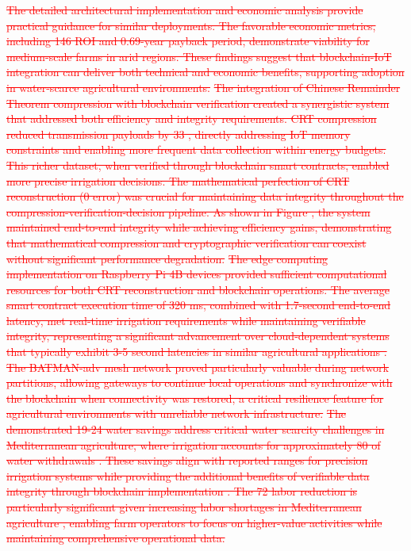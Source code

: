 \documentclass[pdflatex,sn-mathphys-num]{sn-jnl}
\theoremstyle{thmstyleone}
\theoremstyle{thmstyletwo}
\theoremstyle{thmstylethree}
\begin{document}
{\textcolor{red}{\sout{The detailed architectural implementation and economic analysis provide practical guidance for similar deployments. The favorable economic metrics, including 146 ROI and 0.69-year payback period, demonstrate viability for medium-scale farms in arid regions. These findings suggest that blockchain-IoT integration can deliver both technical and economic benefits, supporting adoption in water-scarce agricultural environments.}}
\textcolor{red}{\sout{The integration of Chinese Remainder Theorem compression with blockchain verification created a synergistic system that addressed both efficiency and integrity requirements. CRT compression reduced transmission payloads by 33 , directly addressing IoT memory constraints and enabling more frequent data collection within energy budgets. This richer dataset, when verified through blockchain smart contracts, enabled more precise irrigation decisions. The mathematical perfection of CRT reconstruction (0 error) was crucial for maintaining data integrity throughout the compression-verification-decision pipeline. As shown in Figure , the system maintained end-to-end integrity while achieving efficiency gains, demonstrating that mathematical compression and cryptographic verification can coexist without significant performance degradation.}}
\textcolor{red}{\sout{The edge computing implementation on Raspberry Pi 4B devices provided sufficient computational resources for both CRT reconstruction and blockchain operations. The average smart contract execution time of 320 ms, combined with 1.7-second end-to-end latency, met real-time irrigation requirements while maintaining verifiable integrity, representing a significant advancement over cloud-dependent systems that typically exhibit 3-5 second latencies in similar agricultural applications . The BATMAN-adv mesh network proved particularly valuable during network partitions, allowing gateways to continue local operations and synchronize with the blockchain when connectivity was restored, a critical resilience feature for agricultural environments with unreliable network infrastructure.}}
\textcolor{red}{\sout{The demonstrated 19-24 water savings address critical water scarcity challenges in Mediterranean agriculture, where irrigation accounts for approximately 80 of water withdrawals . These savings align with reported ranges for precision irrigation systems while providing the additional benefits of verifiable data integrity through blockchain implementation . The 72 labor reduction is particularly significant given increasing labor shortages in Mediterranean agriculture , enabling farm operators to focus on higher-value activities while maintaining comprehensive operational data.}}
}
\end{document}
